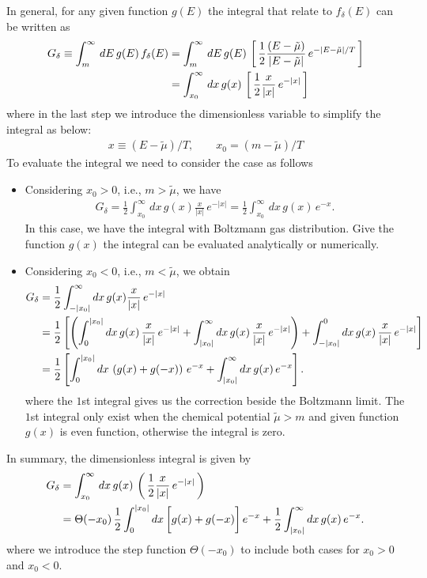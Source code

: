 \documentclass[sn-mathphys,Numbered]{sn-jnl}
\theoremstyle{thmstyleone}%
\theoremstyle{thmstyletwo}%
\theoremstyle{thmstylethree}%
\begin{document}
In general, for any given function $g(E)$ the integral that relate to $f_\delta(E)$ can be written as
\begin{align}
\label{Integral001}
G_{\delta}\equiv\int^{\infty}_{m}\,dE\,g(E)\,f_\delta(E)&=\int^\infty_{m}\,dE\,g(E)\,\left[\,\frac{1}{2}\frac{(E-\tilde\mu)}{|E-\tilde\mu|}\,e^{-|E-\tilde\mu|/T}\,\right]\notag\\
&=\int^\infty_{x_0}\,dx\,g(x)\,\left[\,\frac{1}{2}\frac{x}{|x|}\,e^{-|x|}\,\right]
\end{align}
where in the last step we introduce the dimensionless variable to simplify the integral as below:
\begin{align}\label{Dimensionless}
x\equiv\left({E-\tilde\mu}\right)/T,\qquad x_0=(m-\tilde\mu)/T
\end{align}
To evaluate the integral we need to consider the case as follows
\begin{itemize}
  \item Considering $x_0>0$, i.e., $m>\tilde\mu$, we have
  \begin{align}
  G_\delta=\frac{1}{2}\int^\infty_{x_0}\,dx\,g(x)\frac{x}{|x|}\,e^{-|x|}=\frac{1}{2}\int^{\infty}_{x_0}\,dx\,g(x)\,e^{-x}.
  \end{align}
  In this case, we have the integral with Boltzmann gas distribution. Give the function $g(x)$ the integral can be evaluated analytically or numerically. 
  \item Considering $x_0<0$, i.e., $m<\tilde\mu$, we obtain
  \begin{align}
   G_\delta&=\frac{1}{2}\int^\infty_{-|x_0|}dx\,g(x)\frac{x}{|x|}\,e^{-|x|}\notag\\
   &=\frac{1}{2}\left[\left(\int_0^{|x_0|}dx\,g(x)\,\frac{x}{|x|}\,e^{-|x|}+\int^\infty_{|x_0|}dx\,g(x)\,\frac{x}{|x|}\,e^{-|x|}\right)+\int^0_{-|x_0|}dx\,g(x)\,\frac{x}{|x|}\,e^{-|x|}\right]\notag\\
   &=\frac{1}{2}\left[\int_{0}^{|x_0|}dx\,\left(g(x)+g(-x)\right)\,e^{-x}+\int^\infty_{|x_0|}dx\,g(x)\,e^{-x}\right].
  \end{align}
  where the $1$st integral gives us the correction beside the Boltzmann limit. The $1$st integral only exist when the chemical potential $\tilde\mu>m$ and given function $g(x)$ is even function, otherwise the integral is zero.
\end{itemize}
In summary, the dimensionless integral is given by
\begin{align}
G_\delta&=\int^\infty_{x_0}\,dx\,g(x)\,\left(\,\frac{1}{2}\frac{x}{|x|}\,e^{-|x|}\,\right)\notag\\
&=\Theta(-x_0)\,\frac{1}{2}\int_{0}^{|x_0|}dx\,\bigg[g(x)+g(-x)\bigg]\,e^{-x}+\frac{1}{2}\int^\infty_{|x_0|}dx\,g(x)\,e^{-x}.
\end{align}
where we introduce the step function $\Theta(-x_0)$ to include both cases for $x_0>0$ and $x_0<0$.
\end{document}
